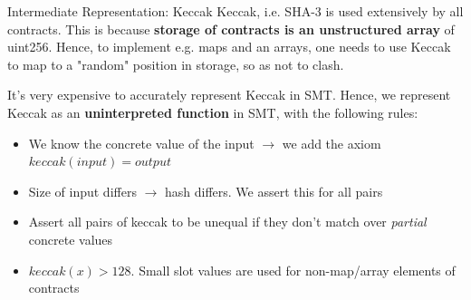 \documentclass[aspectratio=169]{beamer}
\begin{document}
\begin{frame}[fragile=singleslide]{Intermediate Representation: Keccak}
Keccak, i.e. SHA-3 is used extensively by all contracts. This is because \textbf{storage of contracts is an unstructured array} of uint256. Hence, to implement e.g. maps and an arrays, one needs to use Keccak to map to a "random" position in storage, so as not to clash.
\bigskip

It's very expensive to accurately represent Keccak in SMT. Hence, we represent Keccak as an \textbf{uninterpreted function} in SMT, with the following rules:
\begin{itemize}
\item We know the concrete value of the input $\rightarrow$ we add the axiom $keccak(input)=output$
\item Size of input differs $\rightarrow$ hash differs. We assert this for all pairs
\item Assert all pairs of keccak to be unequal if they don't match over \emph{partial} concrete values
\item $keccak(x) > 128$. Small slot values are used for non-map/array elements of contracts
\end{itemize}
\end{frame}
%
%
%
\end{document}
